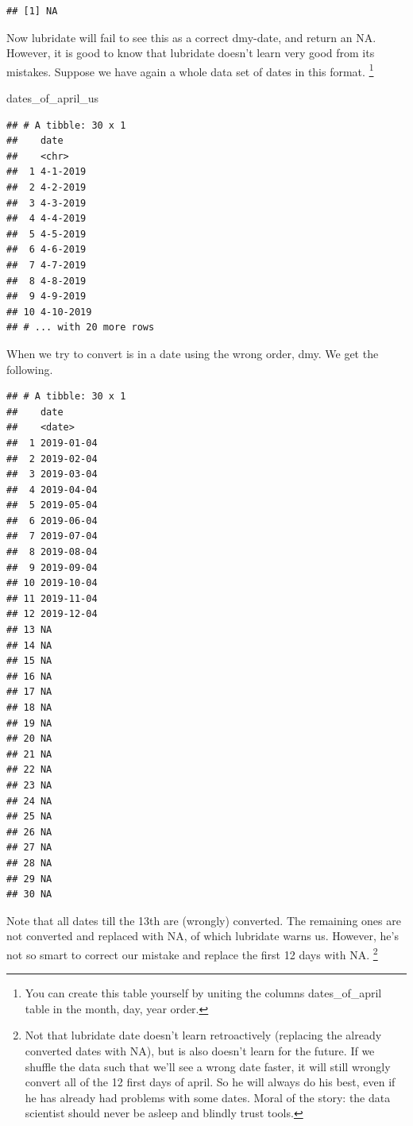 \documentclass[]{tufte-book}
\newenvironment{Shaded}{}{}
\newcommand{\DataTypeTok}[1]{\textcolor[rgb]{0.56,0.13,0.00}{#1}}
\newcommand{\KeywordTok}[1]{\textcolor[rgb]{0.00,0.44,0.13}{\textbf{#1}}}
\newcommand{\NormalTok}[1]{#1}
\newcommand{\OperatorTok}[1]{\textcolor[rgb]{0.40,0.40,0.40}{#1}}
\newcommand{\StringTok}[1]{\textcolor[rgb]{0.25,0.44,0.63}{#1}}
\begin{document}
\begin{verbatim}
## [1] NA
\end{verbatim}

Now lubridate will fail to see this as a correct dmy-date, and return an NA. However, it is good to know that lubridate doesn't learn very good from its mistakes. Suppose we have again a whole data set of dates in this format. \footnote{You can create this table yourself by uniting the columns dates\_of\_april table in the month, day, year order.}

\begin{Shaded}
\begin{Highlighting}[]
\NormalTok{dates_of_april_us}
\end{Highlighting}
\end{Shaded}

\begin{verbatim}
## # A tibble: 30 x 1
##    date     
##    <chr>    
##  1 4-1-2019 
##  2 4-2-2019 
##  3 4-3-2019 
##  4 4-4-2019 
##  5 4-5-2019 
##  6 4-6-2019 
##  7 4-7-2019 
##  8 4-8-2019 
##  9 4-9-2019 
## 10 4-10-2019
## # ... with 20 more rows
\end{verbatim}

When we try to convert is in a date using the wrong order, dmy. We get the following.

\begin{verbatim}
## # A tibble: 30 x 1
##    date      
##    <date>    
##  1 2019-01-04
##  2 2019-02-04
##  3 2019-03-04
##  4 2019-04-04
##  5 2019-05-04
##  6 2019-06-04
##  7 2019-07-04
##  8 2019-08-04
##  9 2019-09-04
## 10 2019-10-04
## 11 2019-11-04
## 12 2019-12-04
## 13 NA        
## 14 NA        
## 15 NA        
## 16 NA        
## 17 NA        
## 18 NA        
## 19 NA        
## 20 NA        
## 21 NA        
## 22 NA        
## 23 NA        
## 24 NA        
## 25 NA        
## 26 NA        
## 27 NA        
## 28 NA        
## 29 NA        
## 30 NA
\end{verbatim}

\begin{Shaded}
\end{Shaded}

Note that all dates till the 13th are (wrongly) converted. The remaining ones are not converted and replaced with NA, of which lubridate warns us. However, he's not so smart to correct our mistake and replace the first 12 days with NA. \footnote{Not that lubridate date doesn't learn retroactively (replacing the already converted dates with NA), but is also doesn't learn for the future. If we shuffle the data such that we'll see a wrong date faster, it will still wrongly convert all of the 12 first days of april. So he will always do his best, even if he has already had problems with some dates. Moral of the story: the data scientist should never be asleep and blindly trust tools.}
\end{document}
